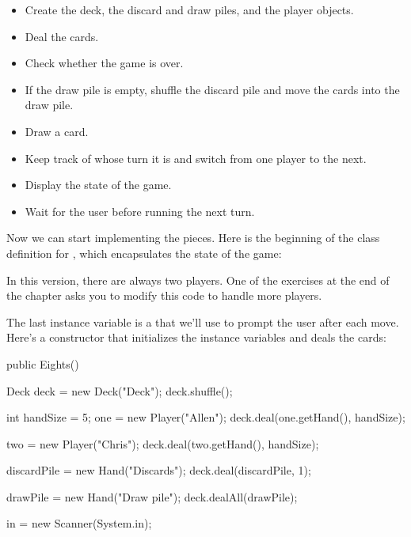 \begin{itemize}

\item Create the deck, the discard and draw piles, and the player objects.

\item Deal the cards.

\item Check whether the game is over.

\item If the draw pile is empty, shuffle the discard pile and move the cards into the draw pile.

\item Draw a card.

\item Keep track of whose turn it is and switch from one player to the next.

\item Display the state of the game.

\item Wait for the user before running the next turn.

\end{itemize}

Now we can start implementing the pieces.
Here is the beginning of the class definition for , which encapsulates the state of the game:

\begin{code}
public class Eights {

    private Player one;
    private Player two;
    private Hand drawPile;
    private Hand discardPile;
    private Scanner in;
\end{code}

In this version, there are always two players.
One of the exercises at the end of the chapter asks you to modify this code to handle more players.

The last instance variable is a  that we'll use to prompt the user after each move.
Here's a constructor that initializes the instance variables and deals the cards:

\begin{code}
public Eights() {
    Deck deck = new Deck("Deck");
    deck.shuffle();

    int handSize = 5;
    one = new Player("Allen");
    deck.deal(one.getHand(), handSize);

    two = new Player("Chris");
    deck.deal(two.getHand(), handSize);

    discardPile = new Hand("Discards");
    deck.deal(discardPile, 1);

    drawPile = new Hand("Draw pile");
    deck.dealAll(drawPile);

    in = new Scanner(System.in);
}
\end{code}

